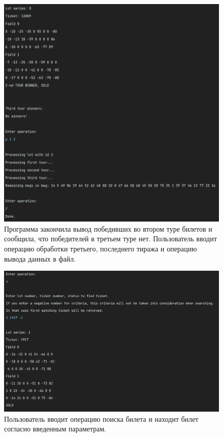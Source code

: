 \documentclass[a4paper,14pt]{article}
\begin{document}
\begin{figure}
  \centering
  \includegraphics[width=\linewidth]{pictures/5}
  \caption{Программа закончила вывод победивших во втором туре билетов и сообщила, что победителей в третьем туре нет. Пользователь вводит операцию обработки третьего, последнего тиража и операцию вывода данных в файл.}
\end{figure}
\begin{figure}
  \centering
  \includegraphics[width=\linewidth]{pictures/6}
  \caption{Пользователь вводит операцию поиска билета и находит билет согласно введенным параметрам.}
\end{figure}
\end{document}

